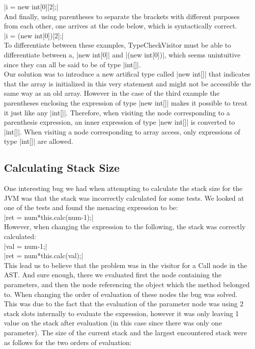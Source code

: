 \documentclass[paper=a4, fontsize=11pt]{scrartcl} %
\numberwithin{equation}{section} %
\numberwithin{figure}{section} %
\numberwithin{table}{section} %
\begin{document}
|i = new int[0][2];|\\

And finally, using parentheses to separate the brackets with different purposes from each other, one arrives at the code below, which is syntactically correct.\\

|i = (new int[0])[2];|\\

To differentiate between these examples, TypeCheckVisitor must be able to differentiate between a, |new int[0]| and |(new int[0])|, which seems unintuitive since they can all be said to be of type |int[]|.\\

Our solution was to introduce a new artifical type called |new int[]| that indicates that the array is initialized in this very statement and might not be accessible the same way as an old array.
However in the case of the third example the parentheses enclosing the expression of type |new int[]| makes it possible to treat it just like any |int[]|.
Therefore, when visiting the node corresponding to a parenthesis expression, an inner expression of type |new int[]| is converted to |int[]|.
When visiting a node corresponding to array access, only expressions of type |int[]| are allowed.

\subsection{Calculating Stack Size}

One interesting bug we had when attempting to calculate the stack size for the JVM was that the stack was incorrectly calculated for some tests.
We looked at one of the tests and found the menacing expression to be:\\

|ret = num*this.calc(num-1);|\\

However, when changing the expression to the following, the stack was correctly calculated:\\

|val = num-1;|\\
|ret = num*this.calc(val);|\\

This lead us to believe that the problem was in the visitor for a Call node in the AST.
And sure enough, there we evaluated first the node containing the parameters, and then the node referencing the object which the method belonged to.
When changing the order of evaluation of these nodes the bug was solved.
This was due to the fact that the evaluation of the parameter node was using 2 stack slots internally to evaluate the expression, however it was only leaving 1 value on the stack after evaluation (in this case since there was only one parameter).
The size of the current stack and the largest encountered stack were as follows for the two orders of evaluation:\\
\end{document}
